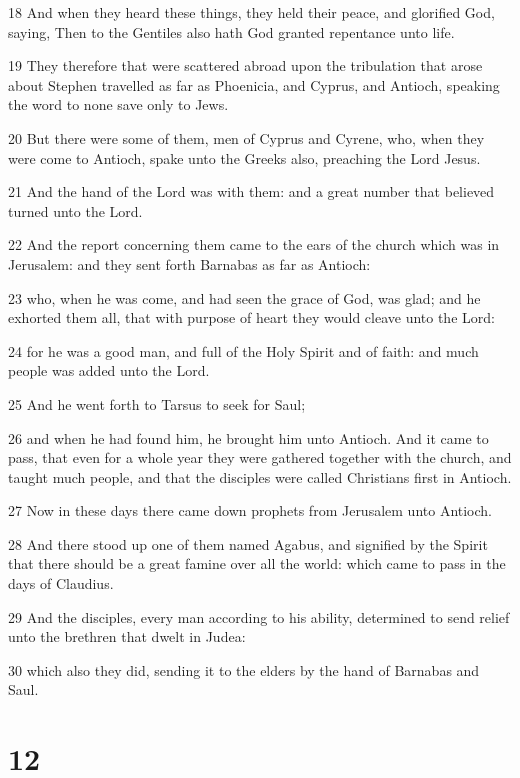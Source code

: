 \par 18 And when they heard these things, they held their peace, and glorified God, saying, Then to the Gentiles also hath God granted repentance unto life.
\par 19 They therefore that were scattered abroad upon the tribulation that arose about Stephen travelled as far as Phoenicia, and Cyprus, and Antioch, speaking the word to none save only to Jews.
\par 20 But there were some of them, men of Cyprus and Cyrene, who, when they were come to Antioch, spake unto the Greeks also, preaching the Lord Jesus.
\par 21 And the hand of the Lord was with them: and a great number that believed turned unto the Lord.
\par 22 And the report concerning them came to the ears of the church which was in Jerusalem: and they sent forth Barnabas as far as Antioch:
\par 23 who, when he was come, and had seen the grace of God, was glad; and he exhorted them all, that with purpose of heart they would cleave unto the Lord:
\par 24 for he was a good man, and full of the Holy Spirit and of faith: and much people was added unto the Lord.
\par 25 And he went forth to Tarsus to seek for Saul;
\par 26 and when he had found him, he brought him unto Antioch. And it came to pass, that even for a whole year they were gathered together with the church, and taught much people, and that the disciples were called Christians first in Antioch.
\par 27 Now in these days there came down prophets from Jerusalem unto Antioch.
\par 28 And there stood up one of them named Agabus, and signified by the Spirit that there should be a great famine over all the world: which came to pass in the days of Claudius.
\par 29 And the disciples, every man according to his ability, determined to send relief unto the brethren that dwelt in Judea:
\par 30 which also they did, sending it to the elders by the hand of Barnabas and Saul.

\chapter{12}

